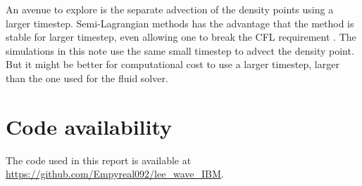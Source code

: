 \documentclass[11pt,letterpaper]{article}
\begin{document}
An avenue to explore is the separate advection of the density points using a larger timestep. Semi-Lagrangian methods has the advantage that the method is stable for larger timestep, even allowing one to break the CFL requirement \parencite{SpiegelmanKatz_06}. The simulations in this note use the same small timestep to advect the density point. But it might be better for computational cost to use a larger timestep, larger than the one used for the fluid solver.

\appendix
\section{Code availability}
The code used in this report is available at \url{https://github.com/Empyreal092/lee_wave_IBM}. 


\vfill
\printbibliography
\end{document}
